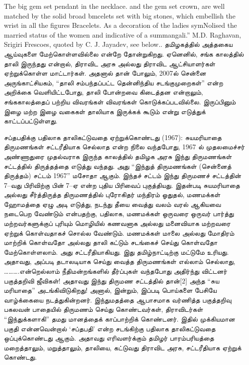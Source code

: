 {The big gem set pendant in the necklace. and the gem set crown, are well matched by the solid broad bmcelets set with big stones, which embellish the wrist in all the figures Bracelets. As a decoration of the ladies symNolised the married status of the women and indicative of a summangali.” M.D. Raghavan, Srigiri Frescoes, quoted by C. J. Jayadev, see below.}. தமிழகத்தில் அத்தகைய ஆய்வுகளை மேற்கொள்ளவில்லை என்றே தோன்றுகிறது. ஏனெனில், சங்க காலத்தில் தாலி இருந்தது என்றால், திராவிட அரசு அல்லது திராவிட ஆட்சியாளர்கள் ஏற்றுக்கொள்ள மாட்டார்கள். அதனால் தான் போலும், 2007ல் சென்னை அருங்காட்சியகம், “தாலி சம்பந்தப்பட்ட தென்னிந்திய சடங்குமுறைகள்” என்ற அறிக்கை வெளியிட்டபோது, தாலி போன்றவை கிடைத்தன என்றாலும், சங்ககாலத்தைப் பற்றிய விவரங்கள் விவரங்கள் கொடுக்கப்படவில்லை. இருப்பினும் இழை மற்ற இழை வகைகள் தாலியாக இருக்கக் கூடும் என்று எடுத்துக் காட்டப்பட்டுள்ளது.

சப்தபதிக்கு பதிலாக தாலிகட்டுவதை ஏற்றுக்கொண்டது (1967): சுயமரியாதை திருமணங்கள் சட்டரீதியாக செல்லாத என்ற நிலை வந்தபோது, 1967 ல் முதலமைச்சர் அண்ணாதுரை முதல்வராக இருந்த காலத்தில் தமிழக அரசு இந்து திருமணங்கள் சட்டத்தில் திருத்தத்தை எடுத்து வந்தது. அது “இந்துத் திருமணங்கள் (சென்னைத் திருத்தம்) சட்டம் 1967” மசோதா ஆகும். இந்தச் சட்டம் இந்து திருமணச் சட்டத்தின் 7–வது பிரிவிற்கு பின் 7–ஏ என்ற புதிய பிரிவைப் புகுத்தியது. இதன்படி சுயமரியாதை அல்லது சீர்த்திருத்த திருமணத்தில் புரோகிதர் மந்திரம் ஓதுதல், மணமக்கள் ஹோமத்தை ஏழு அடி எடுத்து, நடந்து தீயை வைத்து வலம் வரல் ஆகியவை நடைபெற வேண்டும் என்பதற்கு, பதிலாக, மணமக்கள் ஒருவரை ஒருவர் பார்த்து மற்றவர்களுக்குப் புரியும் மொழியில் கணவனாக அல்லது மனைவியாக மற்றவரை ஏற்றுக் கொள்வதாகச் சொல்ல வேண்டும். மணமக்கள் மாலை அல்லது மோதிரம் மாற்றிக் கொள்வதோ அல்லது தாலி கட்டும் சடங்கைச் செய்து கொள்வதோ மேற்கொள்ளலாம். அது சட்டரீதியாகியது. இது தமிழ்நாட்டிற்கு மட்டுமே உரியது. அதாவது, அப்படி தடாலடியாக செய்து வைத்த திருமணங்கள் எல்லாம் செல்லாது, ……….என்றெல்லாம் நீதிமன்றங்களில் தீர்ப்புகள் வந்தபோது அதிர்ந்து விட்டனர் பகுத்தறிவி ஜீவிகள்! அதாவது இந்து திருமண சட்டத்தில் தான்[2] அந்த “சுய மரியாதை” அடங்கிவிடுகிறது! அனால், இன்றும், இப்படி பொய்களை பேசியே வாழ்க்கையை நடத்துகின்றனர். இந்துமதத்தை ஆபாசமாக வர்ணித்த பகுத்தறிவு பகலவன் பாதையில் திருமணம் செய்து கொண்டவர்கள், திராவிடர்கள் “இந்துக்களாகி” தமது மானத்தைக் காப்பாற்றிக் கொண்டனர். இதில் முக்கியமான பகுதி என்னவென்றால் ‘சப்தபதி’ என்ற சடங்கிற்கு பதிலாக தாலிகட்டுவதை ஒப்புக்கொண்டது ஆகும். அதாவது எரிவளர்க்கும் தமிழர் பாரம்பரியத்தை மறைத்தாலும், மறுத்தாலும், தாலியை, கட்டுவது திராவிட அரசு, சட்டரீதியாக ஏற்றுக் கொண்டது.

